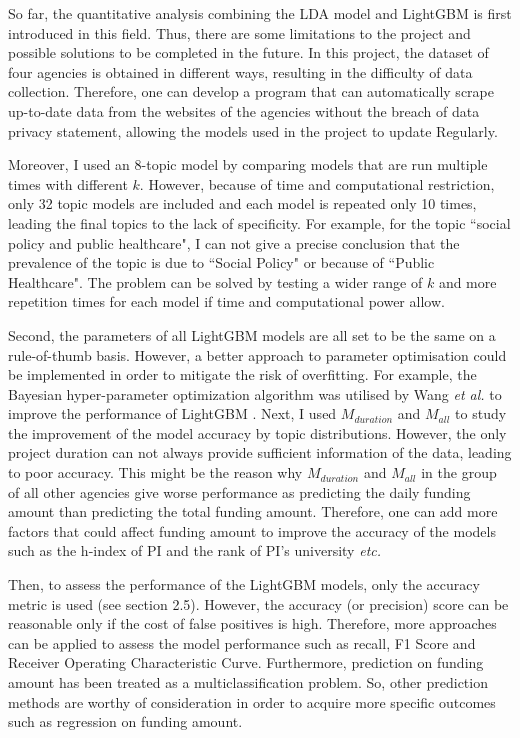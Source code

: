 So far, the quantitative analysis combining the LDA model and LightGBM is first introduced in this field. Thus, there are some limitations to the project and possible solutions to be completed in the future. In this project, the dataset of four agencies is obtained in different ways, resulting in the difficulty of data collection. Therefore, one can develop a program that can automatically scrape up-to-date data from the websites of the agencies without the breach of data privacy statement, allowing the models used in the project to update Regularly.

Moreover, I used an 8-topic model by comparing models that are run multiple times with different $k$. However, because of time and computational restriction, only 32 topic models are included and each model is repeated only 10 times, leading the final topics to the lack of specificity. For example, for the topic ``social policy and public healthcare", I can not give a precise conclusion that the prevalence of the topic is due to ``Social Policy" or because of ``Public Healthcare". The problem can be solved by testing a wider range of $k$ and more repetition times for each model if time and computational power allow.

Second, the parameters of all LightGBM models are all set to be the same on a rule-of-thumb basis. However, a better approach to parameter optimisation could be implemented in order to mitigate the risk of overfitting. For example, the Bayesian hyper-parameter optimization algorithm was utilised by Wang \textit{et al.} to improve the performance of LightGBM \cite{wang2020}. Next, I used $M_{duration}$ and $M_{all}$ to study the improvement of the model accuracy by topic distributions. However, the only project duration can not always provide sufficient information of the data, leading to poor accuracy. This might be the reason why $M_{duration}$ and $M_{all}$ in the group of all other agencies give worse performance as predicting the daily funding amount than predicting the total funding amount. Therefore, one can add more factors that could affect funding amount to improve the accuracy of the models such as the h-index of PI and the rank of PI's university \textit{etc.}

Then, to assess the performance of the LightGBM models, only the accuracy metric is used (see section 2.5). However, the accuracy (or precision) score can be reasonable only if the cost of false positives is high. Therefore, more approaches can be applied to assess the model performance such as recall, F1 Score and Receiver Operating Characteristic Curve. Furthermore, prediction on funding amount has been treated as a multiclassification problem. So, other prediction methods are worthy of consideration in order to acquire more specific outcomes such as regression on funding amount.

